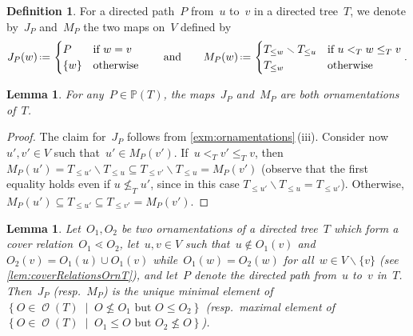 \documentclass{amsart}
\newtheorem{lemma}[theorem]{Lemma}
\theoremstyle{definition}
\newtheorem{definition}[theorem]{Definition}
\renewcommand{\c}[1]{\mathcal{#1}} %
\newcommand{\set}[2]{\left\{ #1 \;\middle|\; #2 \right\}} %
\newcommand{\ssm}{\smallsetminus} %
\newcommand{\eqdef}{\mbox{\,\raisebox{0.2ex}{\scriptsize\ensuremath{\mathrm:}}\ensuremath{=}\,}} %
\newcommand{\lessin}[2]{#1_{\le#2}} %
\DeclareMathOperator{\Orn}{\c{O}}  %
\newcommand{\PP}{\mathbb P} %
\begin{document}
\begin{definition}
\label{def:irreducibleOrnamentationsT}
For a directed path~$P$ from~$u$ to~$v$ in a directed tree~$T$, we denote by~$J_P$ and~$M_P$ the two maps on~$V$ defined by
\[
J_P(w) \eqdef \begin{cases} P & \text{if } w = v \\ \{w\} & \text{otherwise} \end{cases}
\qquad\text{and}\qquad
M_P(w) \eqdef \begin{cases} \lessin{T}{w} \ssm \lessin{T}{u} & \text{if } u <_T w \le_T v \\ \lessin{T}{w} & \text{otherwise} \end{cases}
.
\]
\end{definition}

\begin{lemma}
For any~$P \in \PP(T)$, the maps~$J_P$ and~$M_P$ are both ornamentations of~$T$.
\end{lemma}

\begin{proof}
The claim for~$J_P$ follows from \cref{exm:ornamentations}\,(iii).
Consider now~$u', v' \in V$ such that~$u' \in M_P(v')$.
If~$u <_T v' \le_T v$, then~$M_P(u') = \lessin{T}{u'} \ssm \lessin{T}{u} \subseteq \lessin{T}{v'} \ssm \lessin{T}{u} = M_P(v')$ (observe that the first equality holds even if $u \not\le_T u'$, since in this case $\lessin{T}{u'} \ssm \lessin{T}{u} = \lessin{T}{u'}$).
Otherwise, $M_P(u') \subseteq \lessin{T}{u'} \subseteq \lessin{T}{v'} = M_P(v')$.
\end{proof}

\begin{lemma}
\label{lem:semidistributive}
Let~$O_1, O_2$ be two ornamentations of a directed tree~$T$ which form a cover relation~$O_1 \lessdot O_2$, let~$u,v \in V$ such that~$u \notin O_1(v)$ and $O_2(v) = O_1(u) \cup O_1(v)$ while~$O_1(w) = O_2(w)$ for all~${w \in V \ssm \{v\}}$ (see \cref{lem:coverRelationsOrnT}), and let~$P$ denote the directed path from~$u$ to~$v$ in~$T$.
Then~$J_P$ (resp.~$M_P$) is the unique minimal element of~$\set{O \in \Orn(T)}{O \not\le O_1 \text{ but } O \le O_2}$ (resp.~maximal element of~$\set{O \in \Orn(T)}{O_1 \le O \text{ but } O_2 \not\le O}$).
\end{lemma}
\end{document}
